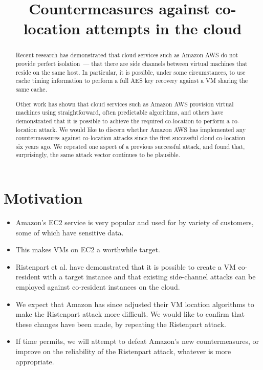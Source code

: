 \documentclass[conference]{IEEEtran}
\begin{document}
\title{Countermeasures against co-location attempts in the cloud}


\author{
}
\maketitle

\begin{abstract}
Recent research has demonstrated that cloud services such as Amazon AWS do not provide perfect isolation~--- that there
  are side channels between virtual machines that reside on the same host.
In particular, it is possible, under some circumstances, to use cache timing information to perform a full AES key
  recovery against a VM sharing the same cache.

Other work has shown that cloud services such as Amazon AWS provision virtual machines using straightforward, often
  predictable algorithms, and others have demonstrated that it is possible to achieve the required co-location to
  perform a co-location attack.
We would like to discern whether Amazon AWS has implemented any countermeasures against co-location attacks since the
  first successful cloud co-location six years ago.
We repeated one aspect of a previous successful attack, and found that, surprisingly, the same attack vector continues
  to be plausible.
\end{abstract}

\section{Motivation}

\begin{itemize}
  \item Amazon's EC2 service is very popular and used for by variety of customers, some of which have sensitive data.
  \item This makes VMs on EC2 a worthwhile target.
  \item Ristenpart et al. have demonstrated that it is possible to create a VM co-resident with a target instance and
    that existing side-channel attacks can be employed against co-resident instances on the cloud.
  \item We expect that Amazon has since adjusted their VM location algorithms to make the Ristenpart attack more
    difficult. We would like to confirm that these changes have been made, by repeating the Ristenpart attack.
  \item If time permits, we will attempt to defeat Amazon's new countermeasures, or improve on the reliability of the
    Ristenpart attack, whatever is more appropriate.
\end{itemize}
\end{document}
